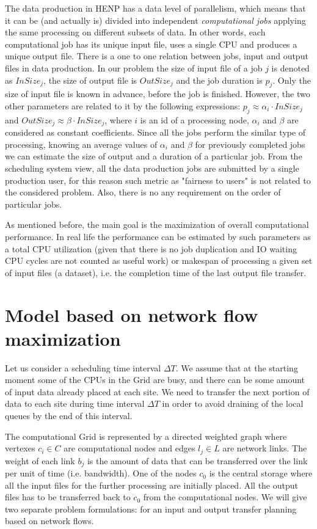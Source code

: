\documentclass{svjour3}                     %
\begin{document}
The data production in HENP has a data level of parallelism, which means that it can be (and actually is) divided into independent \textit{computational jobs} applying the same processing on different subsets of data. In other words, each computational job has its unique input file, uses a single CPU and produces a unique output file. There is a one to one relation between jobs, input and output files in data production. In our problem the size of input file of a job $j$ is denoted as $InSize_{j}$, the size of output file is $OutSize_{j}$ and the job duration is $p_{j}$. Only the size of input file is known in advance, before the job is finished. However, the two other parameters are related to it by the following expressions: $p_{j} \approx \alpha_{i} \cdot InSize_{j}$ and $OutSize_{j} \approx \beta\cdot InSize_{j}$, where $i$ is an id of a processing node, $\alpha_{i}$ and $\beta$ are considered as constant coefficients. Since all the jobs perform the similar type of processing, knowing an average values of $\alpha_{i}$ and $\beta$ for previously completed jobs we can estimate the size of output and a duration of a particular job. From the scheduling system view, all the data production jobs are submitted by a single production user, for this reason such metric as "fairness to users" is not related to the considered problem. Also, there is no any requirement on the order of particular jobs. 


As mentioned before, the main goal is the maximization of overall computational performance. In real life the performance can be estimated by such parameters as a total CPU utilization (given that there is no job duplication and IO waiting CPU cycles are not counted as useful work) or makespan of processing a given set of input files (a dataset), i.e. the completion time of the last output file transfer.

\section{Model based on network flow maximization}
\label{modeling}
Let us consider a scheduling time interval $\Delta T$. We assume that at the
starting moment some of the CPUs in the Grid are busy, and there can be some amount of
input data already placed at each site. We need to transfer the next portion
of data to each site during time interval $\Delta T$ in order to avoid
draining of the local queues by the end of this interval. 

The computational Grid is represented by a directed weighted graph where
vertexes $c_{i} \in C$ are computational nodes and edges $l_{j} \in L$ are
network links. The weight of each link $b_{j}$ is the amount of data that can be
transferred over the link per unit of time (i.e. bandwidth). One of the nodes
$c_{0}$ is the central storage where all the input files for the further
processing are initially placed. All the output files has to be transferred
back to $c_{0}$ from the computational nodes. We will give two separate
problem formulations: for an input and output transfer planning based on network flows. 
\end{document}
